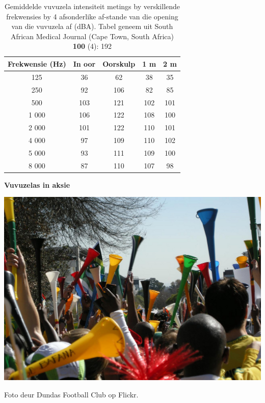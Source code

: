 \begin{minipage}{.5\textwidth}
\begin{table}[H]
\begin{tabular}{ccccc}\hline
Frekwensie (Hz) & In oor & Oorskulp & 1 m & 2 m \\ \hline
125&   36  	&62	 &38	& 35 \\ \hline
250&	92 &	106	& 82	&	 85 \\ \hline
500&	103 & 121&	 102&	 101 		\\ \hline
1 000&	106 & 122&	 108&	 100 	\\  \hline
2 000&	101 & 122&	 110&	 101 	\\ \hline
4 000&	97 & 109&	 110&	 102 	\\ \hline
5 000&	93 & 111&	 109&	 100 		\\ \hline
8 000&  87 & 110&	 107&		 98 	\\ \hline
\end{tabular}
\label{table:vuvuzelas}
\caption{Gemiddelde vuvuzela intensiteit metings by verskillende frekwensies by 4 afsonderlike af-stande van die opening van die vuvuzela af (dBA). Tabel geneem uit South African Medical Journal (Cape Town, South Africa) \textbf{100} (4): 192}
\end{table}
\end{minipage}
\begin{minipage}{.5\textwidth}
\begin{center}
\textbf{Vuvuzelas in aksie}\par
\includegraphics[width=.8\columnwidth]{../Grade10/photos/vuvuzelas_dundas_football_club.jpg}\par
Foto deur Dundas Football Club op Flickr.	
\end{center}
\end{minipage}

